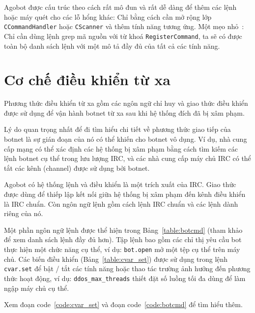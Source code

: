 Agobot được cấu trúc theo cách rất mô đun và rất dễ dàng để thêm các lệnh
hoặc máy quét cho các lỗ hổng khác:
Chỉ bằng cách cần mở rộng lớp \texttt{CCommandHandler} hoặc
\texttt{CScanner} và thêm tính năng tương ứng.
Một mẹo nhỏ~\cite{honeynetgrep}:
Chỉ cần dùng lệnh grep mã nguồn với từ khoá \texttt{RegisterCommand},
ta sẽ có được toàn bộ danh sách lệnh với một mô tả đầy đủ của tất cả các tính năng.

\section{Cơ chế điều khiển từ xa}

Phương thức điều khiển từ xa gồm các ngôn ngữ chỉ huy và giao thức điều khiển được sử dụng
để vận hành botnet từ xa sau khi hệ thống đích đã bị xâm phạm.

Lý do quan trọng nhất để đi tìm hiểu chi tiết về phương thức
giao tiếp của botnet là sự gián đoạn của nó có thể khiến cho botnet vô dụng.
Ví dụ, nhà cung cấp mạng có thể xác định các hệ thống bị xâm phạm bằng cách
tìm kiếm các lệnh botnet cụ thể trong lưu lượng IRC, và các nhà cung cấp
máy chủ IRC có thể tắt các kênh (channel) được sử dụng bởi botnet.

Agobot có hệ thống lệnh và điều khiển là một trích xuất của IRC\@.
Giao thức được dùng để thiếp lập kết nối giữa hệ thống bị xâm phạm đến kênh điều khiển là IRC chuẩn.
Còn ngôn ngữ lệnh gồm cách lệnh IRC chuẩn và các lệnh dành riêng của nó.

Một phần ngôn ngữ lệnh được thể hiện trong Bảng~\ref{table:botcmd}
(tham khảo~\cite{lurhq} để xem danh sách lệnh đầy đủ hơn).
Tập lệnh bao gồm các chỉ thị yêu cầu bot thực hiện một chức năng cụ thể,
ví dụ: \texttt{bot.open} mở một tệp cụ thể trên máy chủ.
Các biến điều khiển (Bảng~\ref{table:cvar_set}) được sử dụng trong lệnh \texttt{cvar.set} để bật / tắt
các tính năng hoặc thao tác trường ảnh hưởng đến phương thức hoạt động,
ví dụ: \verb|ddos_max_threads| thiết đặt số luồng tối đa dùng để làm ngập máy chủ cụ thể.

Xem đoạn code~\ref{code:cvar_set} và đoạn code~\ref{code:botcmd} để tìm hiểu thêm.

